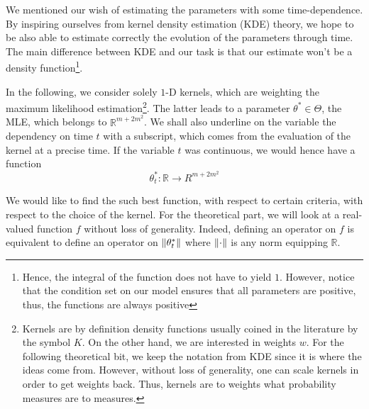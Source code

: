 We mentioned our wish of estimating the parameters with some time-dependence. By inspiring ourselves from kernel density estimation (KDE) theory, we hope to be also able to estimate correctly the evolution of the parameters through time. The main difference between KDE and our task is that our estimate won't be a density function\footnote{Hence, the integral of the function does not have to yield $1$. However, notice that the condition set on our model ensures that all parameters are positive, thus, the functions are always positive}. 

In the following, we consider solely $1$-D kernels, which are weighting the maximum likelihood estimation\footnote{Kernels are by definition density functions usually coined in the literature by the symbol $K$. On the other hand, we are interested in weights $w$. For the following theoretical bit, we keep the notation from KDE since it is where the ideas come from. However, without loss of generality, one can scale kernels in order to get weights back. Thus, kernels are to weights what probability measures are to measures\label{section:diff_kernel_weights}.}. The latter leads to a parameter $\theta^* \in \Theta$, the MLE, which belongs to $\mathbb R^{m+2 m^2}$. We shall also underline on the variable the dependency on time $t$ with a subscript, which comes from the evaluation of the kernel at a precise time. If the variable $t$ was continuous, we would hence have a function $$\theta^*_t \colon \mathbb R  \to R^{m+2 m^2} $$

We would like to find the such best function, with respect to certain criteria, with respect to the choice of the kernel. For the theoretical part, we will look at a real-valued function $f$ without loss of generality. Indeed, defining an operator on $f$ is equivalent to define an operator on $\lVert \theta^*_t\rVert$ where $\lVert \cdot\rVert$ is any norm equipping $\mathbb R$.
\label{section:multi_to_uni}
\label{section:kernel_to_weights}







